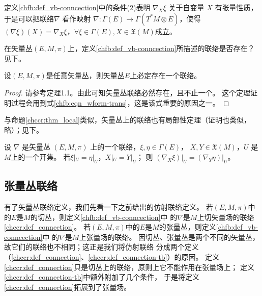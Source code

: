 定义\ref{chfb:def_vb-conncection}中的条件(2)表明 $\nabla_X \xi$ 关于自变量 $X$ 有张量性质，
于是可以把联络$\nabla$ 看作映射 $\nabla: \Gamma(E) \rightarrow \Gamma (T^* M \otimes E )$，使得
$(\nabla \xi)(X)=\nabla_X \xi$，$ \forall \xi \in \Gamma(E), X \in \mathfrak{X}(M) $成立。


在矢量丛$(E,M,\pi)$上，定义\ref{chfb:def_vb-conncection}所描述的联络是否存在？见下。

\begin{theorem}\label{chfb:thm_existence}
    设$(E,M,\pi)$是任意矢量丛，则矢量丛$E$上必定存在一个联络。
\end{theorem}
\begin{proof}
    请参考\parencite[p.104]{cc2001-zh}定理1.1。由此可知矢量丛联络必然存在，且不止一个。
    这个定理证明过程会用到式\eqref{chfb:eqn_wform-trans}，这是该式重要的原因之一。
\end{proof}

与命题\ref{chccr:thm_local}类似，矢量丛上的联络也有局部性定理（证明也类似，略）；见下。
\begin{proposition}
    设 $\nabla$ 是矢量丛 $(E,M,\pi)$ 上的一个联络，$\xi, \eta \in \Gamma(E)$，
    $ X, Y \in \mathfrak{X}(M)$，$U$ 是 $M$上的一个开集。 
    若$ \xi|_U = \eta|_U$，$ X|_U = Y|_U $；
    则 $\left.\left(\nabla_X \xi\right)\right|_U=\left.\left(\nabla_Y \eta\right)\right|_U$。
\end{proposition}

\subsection{张量丛联络}

有了矢量丛联络定义，我们先看一下之前给出的仿射联络定义。
若$(E,M,\pi)$中的$E$是$M$的切丛，则定义\ref{chfb:def_vb-conncection}中
的$\nabla$是$M$上切矢量场的联络\ref{chccr:def_connection}。
若$(E,M,\pi)$中的$E$是$M$的张量丛，则定义\ref{chfb:def_vb-conncection}中
的$\nabla$是$M$上张量场的联络。
因切丛、张量丛是两个不同的矢量丛，故它们的联络也不相同；这正是我们将仿射联络
分成两个定义（\ref{chccr:def_connection}、\ref{chccr:def_connection-tb}）的原因。
定义\ref{chccr:def_connection}只是切丛上的联络，原则上它不能作用在张量场上；
定义\ref{chccr:def_connection-tb}中额外附加了几个条件，
于是将定义\ref{chccr:def_connection}拓展到了张量场。



